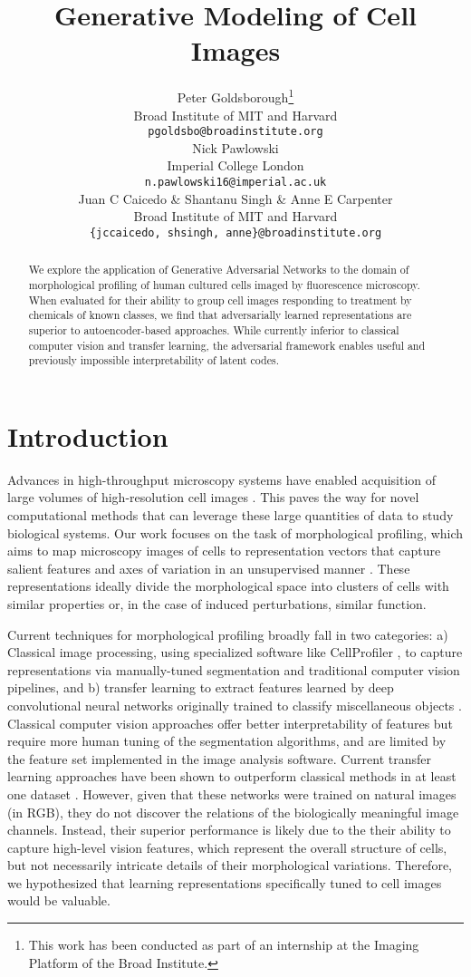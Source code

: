 \documentclass{article}
\title{Generative Modeling of Cell Images}
\author{
  Peter Goldsborough\thanks{This work has been conducted as part of an internship at the Imaging Platform of the Broad Institute.}\\
  Broad Institute of MIT and Harvard \\
  \texttt{pgoldsbo@broadinstitute.org} \\
  \And
  Nick Pawlowski \\
  Imperial College London \\
  \texttt{n.pawlowski16@imperial.ac.uk} \\
  \AND
  Juan C Caicedo \& Shantanu Singh \& Anne E Carpenter\\
  Broad Institute of MIT and Harvard \\
  \texttt{\{jccaicedo, shsingh, anne\}@broadinstitute.org} \\
}
\begin{document}
\maketitle

\begin{abstract}
We explore the application of Generative Adversarial Networks to the domain of morphological profiling of human cultured cells imaged by fluorescence microscopy. When evaluated for their ability to group cell images responding to treatment by chemicals of known classes, we find that adversarially learned representations are superior to autoencoder-based approaches. While currently inferior to classical computer vision and transfer learning, the adversarial framework enables useful and previously impossible interpretability of latent codes.
\end{abstract}

\section{Introduction}
Advances in high-throughput microscopy systems have enabled acquisition of large
volumes of high-resolution cell images \cite{Kraus2016}. This paves the way for
novel computational methods that can leverage these large quantities of data to
study biological systems. Our work focuses on the task of morphological
profiling, which aims to map microscopy images of cells to representation
vectors that capture salient features and axes of variation in an unsupervised
manner \cite{caicedo_profiling}. These representations ideally divide the
morphological space into clusters of cells with similar properties or, in the
case of induced perturbations, similar function.

Current techniques for morphological profiling broadly fall in two categories:
a) Classical image processing, using specialized software like CellProfiler
\cite{Carpenter2006}, to capture representations via manually-tuned segmentation
and traditional computer vision pipelines, and b) transfer learning to extract
features learned by deep convolutional neural networks originally trained to
classify miscellaneous objects \cite{pawlowski2016automating,
ando2017improving}. Classical computer vision approaches offer better
interpretability of features but require more human tuning of the segmentation
algorithms, and are limited by the feature set implemented in the image analysis
software. Current transfer learning approaches have been shown to outperform
classical methods in at least one dataset \cite{ando2017improving}. However,
given that these networks were trained on natural images (in RGB), they do not
discover the relations of the biologically meaningful image channels. Instead,
their superior performance is likely due to the their ability to capture
high-level vision features, which represent the overall structure of cells, but
not necessarily intricate details of their morphological variations. Therefore,
we hypothesized that learning representations specifically tuned to cell images
would be valuable.
\end{document}
